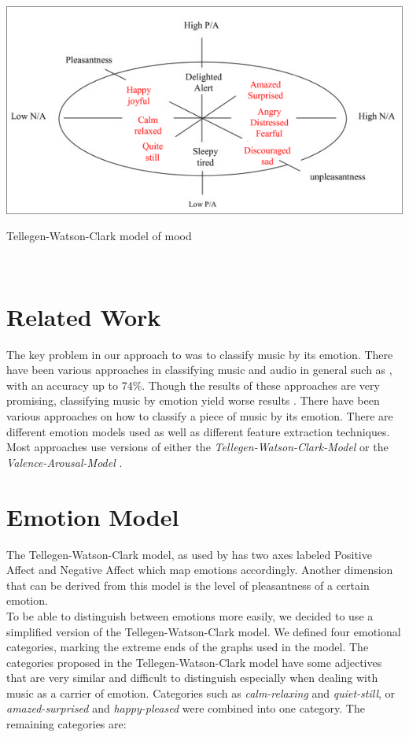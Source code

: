 \documentclass{sigchi-ext}
\begin{document}
\begin{marginfigure}[0pc]
  \begin{minipage}{\marginparwidth}
    \centering
    \includegraphics[width=1.0\marginparwidth]{images/tellegen-watson-clark-model.png}
    \caption{Tellegen-Watson-Clark model of mood \cite{Tellegen1999}}~\label{fig:tellegen-watson-clark}
  \end{minipage}
\end{marginfigure}

\section{Related Work}
The key problem in our approach to was to classify music by its emotion. There have been various approaches in classifying music and audio in general such as \cite{Mckinney2003,Cook2007,Jeremic2015,Tzanetakis2002}, with an accuracy up to 74\%. Though the results of these approaches are very promising, classifying music by emotion yield worse results \cite{Kim2010}. There have been various approaches on how to classify a piece of music by its emotion. There are different emotion models used as well as different feature extraction techniques.\\
Most approaches use versions of either the \textit{Tellegen-Watson-Clark-Model} \cite{Trohidis2011} or the \textit{Valence-Arousal-Model} \cite{Kim2011}.\\

\section{Emotion Model}
The Tellegen-Watson-Clark model, as used by \cite{Trohidis2011} has two axes labeled Positive Affect and Negative Affect which map emotions accordingly. Another dimension that can be derived from this model is the level of pleasantness of a certain emotion.\\
To be able to distinguish between emotions more easily, we decided to use a simplified version of the Tellegen-Watson-Clark model. We defined four emotional categories, marking the extreme ends of the graphs used in the model. The categories proposed in the Tellegen-Watson-Clark model have some adjectives that are very similar and difficult to distinguish especially when dealing with music as a carrier of emotion. Categories such as \textit{calm-relaxing} and \textit{quiet-still}, or \textit{amazed-surprised} and \textit{happy-pleased} were combined into one category. The remaining categories are:
\end{document}
